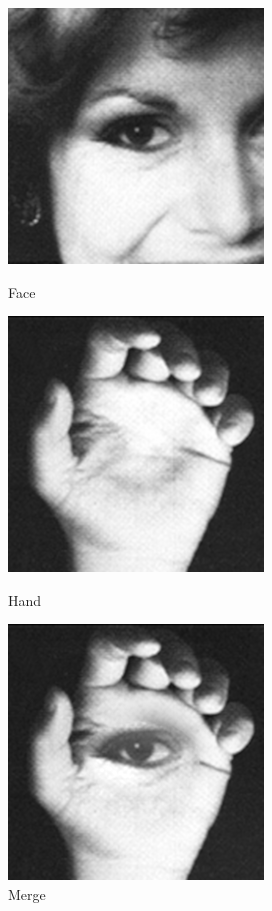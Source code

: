\documentclass{article}
\begin{document}
    \begin{figure}[!htb]
    \begin{center}
      \includegraphics[scale=.55]{./blending/eh/face.png}
      \caption{Face}
    \end{center}
    \endminipage \hfill
    \begin{center}
      \includegraphics[scale=.55]{./blending/eh/hand.png}
      \caption{Hand}
     \end{center}
    \endminipage \hfill
    \begin{center}
      \includegraphics[scale=.55]{./blending/eh/final_1.png}
      \caption{Merge}
    \end{center}
    \endminipage
    \end{figure}
\end{document}
